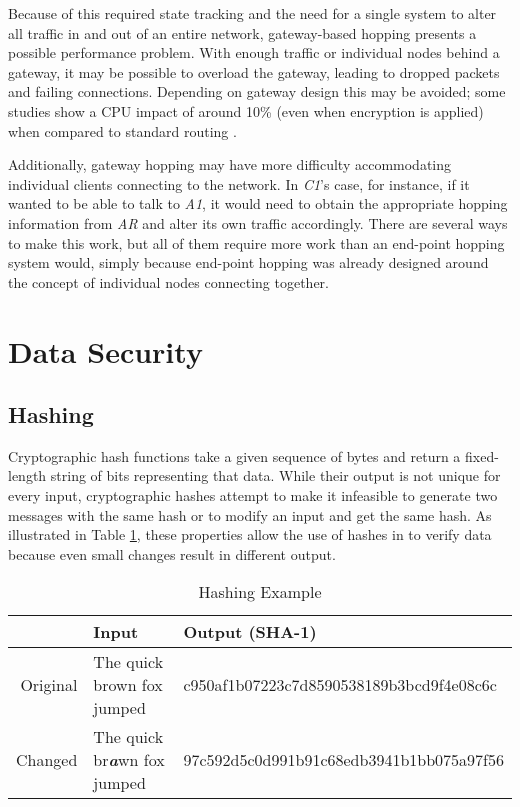 \par Because of this required state tracking and the need for a single system to alter all traffic in and out of an entire network, gateway-based hopping presents a possible performance problem. With enough traffic or individual nodes behind a gateway, it may be possible to overload the gateway, leading to dropped packets and failing connections. Depending on gateway design this may be avoided; some studies show a CPU impact of around 10\% (even when encryption is applied) when compared to standard routing \cite{TAO}.

\par Additionally, gateway hopping may have more difficulty accommodating individual clients connecting to the network. In \textit{C1}'s case, for instance, if it wanted to be able to talk to \textit{A1}, it would need to obtain the appropriate hopping information from \textit{AR} and alter its own traffic accordingly. There are several ways to make this work, but all of them require more work than an end-point hopping system would, simply because end-point hopping was already designed around the concept of individual nodes connecting together.

\section{Data Security}
\label{sec:data_security}

\subsection{Hashing}
\label{sec:hashing}
\par Cryptographic hash functions take a given sequence of bytes and return a fixed-length string of bits representing that data. While their output is not unique for every input, cryptographic hashes attempt to make it infeasible to generate two messages with the same hash or to modify an input and get the same hash. As illustrated in Table \ref{tbl:hashing_example}, these properties allow the use of hashes in to verify data because even small changes result in different output.

\begin{table}[h]
\caption{Hashing Example}
\label{tbl:hashing_example}
\centering
\begin{tabular}{r|l|l}
	& Input & Output (SHA-1)\\
\hline
Original & The quick brown fox jumped & c950af1b07223c7d8590538189b3bcd9f4e08c6c\\
Changed & The quick br\textit{\textbf{a}}wn fox jumped & 97c592d5c0d991b91c68edb3941b1bb075a97f56
\end{tabular}
\end{table}

